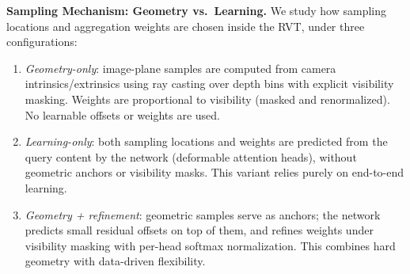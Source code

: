 \documentclass[journal]{IEEEtran}
\begin{document}

\textbf{Sampling Mechanism: Geometry vs.\ Learning.}
We study how sampling locations and aggregation weights are chosen inside the RVT, under three configurations:
\begin{enumerate}
  \item \emph{Geometry-only}: image-plane samples are computed from camera intrinsics/extrinsics using ray casting over depth bins with explicit visibility masking. Weights are proportional to visibility (masked and renormalized). No learnable offsets or weights are used.
  \item \emph{Learning-only}: both sampling locations and weights are predicted from the query content by the network (deformable attention heads), without geometric anchors or visibility masks. This variant relies purely on end-to-end learning.
  \item \emph{Geometry + refinement}: geometric samples serve as anchors; the network predicts small residual offsets on top of them, and refines weights under visibility masking with per-head softmax normalization. This combines hard geometry with data-driven flexibility.
\end{enumerate}

\end{document}

